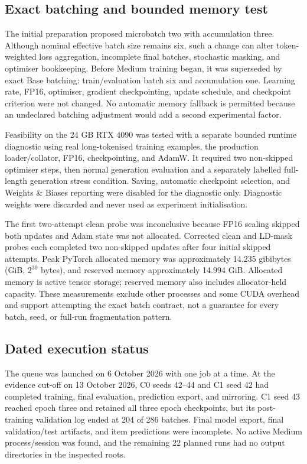 \documentclass[12pt,a4paper]{report}
\begin{document}
\subsection{Exact batching and bounded memory test}

The initial preparation proposed microbatch two with accumulation three. Although nominal effective batch size remains six, such a change can alter token-weighted loss aggregation, incomplete final batches, stochastic masking, and optimiser bookkeeping. Before Medium training began, it was superseded by exact Base batching: train/evaluation batch six and accumulation one. Learning rate, FP16, optimiser, gradient checkpointing, update schedule, and checkpoint criterion were not changed. No automatic memory fallback is permitted because an undeclared batching adjustment would add a second experimental factor.

Feasibility on the 24 GB RTX 4090 was tested with a separate bounded runtime diagnostic using real long-tokenised training examples, the production loader/collator, FP16, checkpointing, and AdamW. It required two non-skipped optimiser steps, then normal generation evaluation and a separately labelled full-length generation stress condition. Saving, automatic checkpoint selection, and Weights \& Biases reporting were disabled for the diagnostic only. Diagnostic weights were discarded and never used as experiment initialisation.

The first two-attempt clean probe was inconclusive because FP16 scaling skipped both updates and Adam state was not allocated. Corrected clean and LD-mask probes each completed two non-skipped updates after four initial skipped attempts. Peak PyTorch allocated memory was approximately 14.235 gibibytes (GiB, $2^{30}$ bytes), and reserved memory approximately 14.994 GiB. Allocated memory is active tensor storage; reserved memory also includes allocator-held capacity. These measurements exclude other processes and some CUDA overhead and support attempting the exact batch contract, not a guarantee for every batch, seed, or full-run fragmentation pattern.

\subsection{Dated execution status}

The queue was launched on 6 October 2026 with one job at a time. At the evidence cut-off on 13 October 2026, C0 seeds 42--44 and C1 seed 42 had completed training, final evaluation, prediction export, and mirroring. C1 seed 43 reached epoch three and retained all three epoch checkpoints, but its post-training validation log ended at 204 of 286 batches. Final model export, final validation/test artifacts, and item predictions were incomplete. No active Medium process/session was found, and the remaining 22 planned runs had no output directories in the inspected roots.
\end{document}
